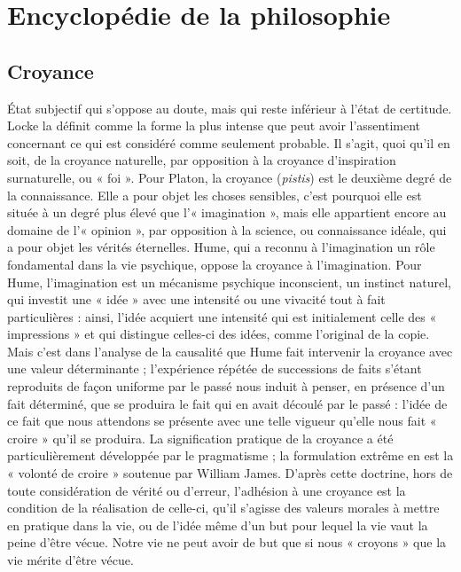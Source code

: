 
\section{Encyclopédie de la philosophie}
\subsection{Croyance}
État subjectif qui s'oppose au
doute, mais qui reste inférieur à l’état de
certitude. Locke la définit comme la
forme la plus intense que peut avoir l’assentiment
concernant ce qui est considéré
comme seulement probable. Il s’agit, quoi
qu'il en soit, de la croyance naturelle, par
opposition à la croyance d'inspiration surnaturelle,
ou « foi ». Pour Platon, la
croyance ({\it pistis}) est le deuxième degré de
la connaissance. Elle a pour objet les
choses sensibles, c’est pourquoi elle est
située à un degré plus élevé que l’« imagination »,
mais elle appartient encore au
domaine de l’« opinion », par opposition
à la science, ou connaissance idéale, qui a
pour objet les vérités éternelles. Hume,
qui a reconnu à l'imagination un rôle fondamental
dans la vie psychique, oppose la
croyance à l'imagination. Pour Hume,
l'imagination est un mécanisme psychique
inconscient, un instinct naturel, qui investit
une « idée » avec une intensité ou une
vivacité tout à fait particulières : ainsi,
l'idée acquiert une intensité qui est initialement
celle des « impressions » et qui
distingue celles-ci des idées, comme l’original
de la copie. Mais c’est dans l’analyse
de la causalité que Hume fait intervenir la
croyance avec une valeur déterminante ;
l'expérience répétée de successions de
faits s’étant reproduits de façon uniforme
par le passé nous induit à penser, en présence
d’un fait déterminé, que se produira
le fait qui en avait découlé par le passé :
l'idée de ce fait que nous attendons se
présente avec une telle vigueur qu’elle
nous fait « croire » qu’il se produira. La
signification pratique de la croyance a été
particulièrement développée par le pragmatisme ;
la formulation extrême en est la
« volonté de croire » soutenue par William
James. D’après cette doctrine, hors
de toute considération de vérité ou d’erreur,
l’adhésion à une croyance est la
condition de la réalisation de celle-ci, qu’il
s'agisse des valeurs morales à mettre en
pratique dans la vie, ou de l’idée même
d’un but pour lequel la vie vaut la peine
d’être vécue. Notre vie ne peut avoir de
but que si nous « croyons » que la vie
mérite d’être vécue.


